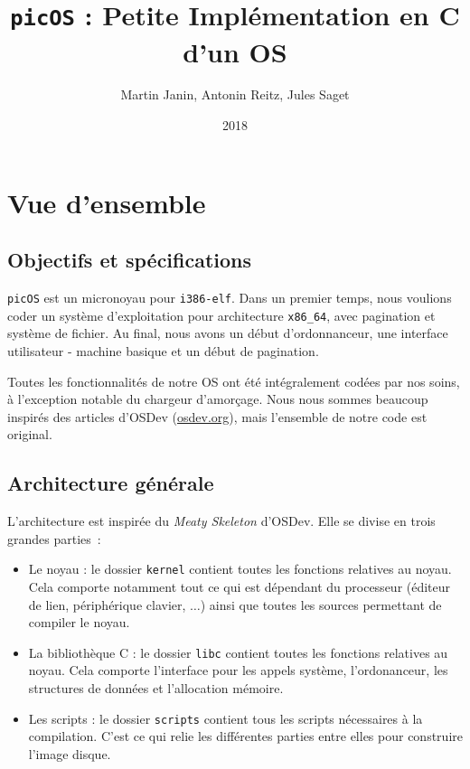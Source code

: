 \documentclass[a4paper, 11pt, twoside]{article}
\title{\texttt{picOS} : Petite Implémentation en C d'un OS}
\author{Martin Janin, Antonin Reitz, Jules Saget}
\date{2018}
\begin{document}
\maketitle

\section{Vue d'ensemble}

\subsection{Objectifs et spécifications}

\texttt{picOS} est un micronoyau pour \texttt{i386-elf}. Dans un premier temps, nous
voulions coder un système d'exploitation pour architecture \texttt{x86\_64}, avec
pagination et système de fichier. Au final, nous avons un début d'ordonnanceur, une 
interface utilisateur - machine basique et un début de pagination.

Toutes les fonctionnalités de notre OS ont été intégralement codées par nos
soins, à l'exception notable du chargeur d'amorçage. Nous nous sommes beaucoup
inspirés des articles d'OSDev (\url{osdev.org}), mais l'ensemble de notre code est
original.

\subsection{Architecture générale}

L'architecture est inspirée du \emph{Meaty Skeleton} d'OSDev. Elle se divise en
trois grandes parties~:
\begin{itemize}
  \item Le noyau : le dossier \texttt{kernel} contient toutes les fonctions
    relatives au noyau. Cela comporte notamment tout ce qui est dépendant du
    processeur (éditeur de lien, périphérique clavier, $\ldots$) ainsi que toutes
    les sources permettant de compiler le noyau.
  \item La bibliothèque C : le dossier \texttt{libc} contient toutes les
    fonctions relatives au noyau. Cela comporte l'interface pour les appels
    système, l'ordonanceur, les structures de données et l'allocation mémoire.
  \item Les scripts : le dossier \texttt{scripts} contient tous les scripts
    nécessaires à la compilation. C'est ce qui relie les différentes parties
    entre elles pour construire l'image disque.
\end{itemize}
\end{document}
